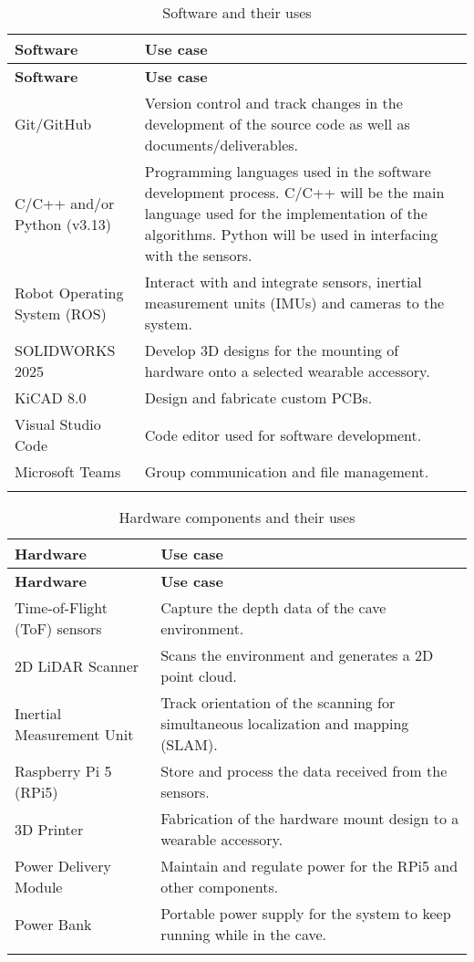 \documentclass[11pt]{article}
\begin{document}
			\begin{longtable}{p{} p{}}
				\toprule
				\textbf{Software} & \textbf{Use case} \\
				\toprule
				\endfirsthead
				
				\toprule
				\textbf{Software} & \textbf{Use case} \\
				\toprule
				\endhead
				
				Git/GitHub & Version control and track changes in the development of the source code as well as documents/deliverables. \\
				\midrule
				C/C++ and/or Python (v3.13) & Programming languages used in the software development process. C/C++ will be the main language used for the implementation of the algorithms. Python will be used in interfacing with the sensors.\\
				\midrule
				Robot Operating System (ROS) & Interact with and integrate sensors, inertial measurement units (IMUs) and cameras to the system.\\
				\midrule
				SOLIDWORKS 2025 & Develop 3D designs for the mounting of hardware onto a selected wearable accessory.\\
				\midrule
				KiCAD 8.0 &  Design and fabricate custom PCBs. \\
				\midrule
				Visual Studio Code & Code editor used for software development.\\
				\midrule
				Microsoft Teams & Group communication and file management.\\
				\bottomrule
				\caption{Software and their uses}
			\end{longtable}
		
			
			\begin{longtable}{p{} p{}}
				\toprule
				\textbf{Hardware} & \textbf{Use case}\\
				\toprule
				\endfirsthead
				
				\toprule
				\textbf{Hardware} & \textbf{Use case}\\
				\toprule
				\endhead
				
				Time-of-Flight (ToF) sensors & Capture the depth data of the cave environment.\\
				\midrule
				2D LiDAR Scanner & Scans the environment and generates a 2D point cloud.\\
				\midrule
				Inertial Measurement Unit & Track orientation of the scanning for simultaneous localization and mapping (SLAM).\\
				\midrule
				Raspberry Pi 5 (RPi5) & Store and process the data received from the sensors.\\
				\midrule
				3D Printer & Fabrication of the hardware mount design to a wearable accessory.\\
				\midrule
				Power Delivery Module & Maintain and regulate power for the RPi5 and other components. \\
				\midrule
				Power Bank & Portable power supply for the system to keep running while in the cave.\\
				\bottomrule
				\caption{Hardware components and their uses}
			\end{longtable}
			
\end{document}
